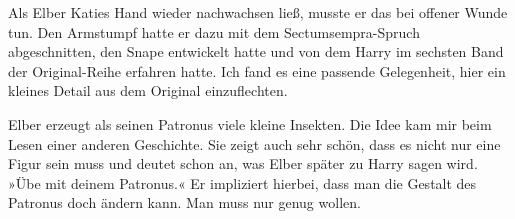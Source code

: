 \begin{kommentar}
Als Elber Katies Hand wieder nachwachsen ließ, musste er das bei offener Wunde tun. Den Armstumpf hatte er dazu mit dem Sectumsempra-Spruch abgeschnitten, den Snape entwickelt hatte und von dem Harry im sechsten Band der Original-Reihe erfahren hatte. Ich fand es eine passende Gelegenheit, hier ein kleines Detail aus dem Original einzuflechten.
\end{kommentar}

\begin{kommentar}
Elber erzeugt als seinen Patronus viele kleine Insekten. Die Idee kam mir beim Lesen einer anderen Geschichte. Sie zeigt auch sehr schön, dass es nicht nur eine Figur sein muss und deutet schon an, was Elber später zu Harry sagen wird. »Übe mit deinem Patronus.« Er impliziert hierbei, dass man die Gestalt des Patronus doch ändern kann. Man muss nur genug wollen.
\end{kommentar}

